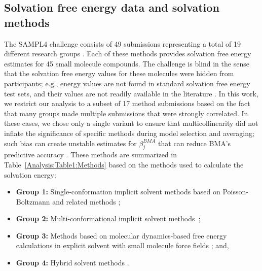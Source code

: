 \documentclass[journal=jpcbfk, manuscript=article]{achemso}
\newcommand{\+}[1]{\ensuremath{\mathbf{#1}}}
\begin{document}
\subsection{Solvation free energy data and solvation methods} \label{EP:DataModels}
The SAMPL4 challenge consists of 49 submissions representing a total of 19 different research groups \cite{Mobley:2014}.
Each of these methods provides solvation free energy estimates for 45 small molecule compounds.
The challenge is blind in the sense that the solvation free energy values for these molecules were hidden from participants; e.g., energy values are not found in standard solvation free energy test sets, and their values are not readily available in the literature \cite{Guthrie:2014}. 
In this work, we restrict our analysis to a subset of 17 method submissions based on the fact that many groups made multiple submissions that were strongly correlated.
In these cases, we chose only a single variant to ensure that multicollinearity did not inflate the significance of specific methods during model selection and averaging; such bias can create unstable estimates for $\beta^{BMA}_j$ that can reduce BMA's predictive accuracy \cite{Clyde:1999}.
These methods are summarized in Table~\ref{Analysis:Table1:Methods} based on the methods used to calculate the solvation energy: 
\begin{itemize} 
	\item \textbf{Group 1:} Single-conformation implicit solvent methods \cite{Ellingson:2014, Nicholl:2010, Hawkins} based on Poisson-Boltzmann and related methods \cite{Fixman:1979, Honig:1995, Davis:1990};
	\item \textbf{Group 2:} Multi-conformational implicit solvent methods~\cite{Sandberg:2013, Klamt:2009, Hogues:2014, Sulea:2011, Reinisch:2014}; 
	\item \textbf{Group 3:} Methods based on molecular dynamics-based free energy calculations in explicit solvent \cite{Klimovich:2010,Muddana:2014,Mobley:2009c,Mobley:2007} with small molecule force fields \cite{Wang:2004B};  and, 
	\item \textbf{Group 4:} Hybrid solvent methods \cite{Li:2014}.
\end{itemize}
\end{document}
